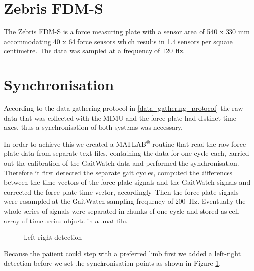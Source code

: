 \section{Zebris FDM-S}

The Zebris FDM-S is a force measuring plate with a sensor area of 540 x 330 mm accommodating 40 x 64 force sensors which results in 1.4 sensors per square centimetre. The data was sampled at a frequency of 120 Hz.

\section{Synchronisation}

According to the data gathering protocol in \ref{data_gathering_protocol} the raw data that was collected with the MIMU and the force plate had distinct time axes, thus a synchronisation of both systems was necessary.

In order to achieve this we created a MATLAB$\textsuperscript{\textregistered}$ routine that read the raw force plate data from separate text files, containing the data for one cycle each, carried out the calibration of the GaitWatch data and performed the synchronisation. Therefore it first detected the separate gait cycles, computed the differences between the time vectors of the force plate signals and the GaitWatch signals and corrected the force plate time vector, accordingly. Then the force plate signals were resampled at the GaitWatch sampling frequency of \mbox{200 Hz}. Eventually the whole series of signals were separated in chunks of one cycle and stored as cell array of time series objects in a .mat-file.

\begin{figure}
	\centering
	\caption{Left-right detection}
	\label{fig:left_right_detect}
\end{figure}

Because the patient could step with a preferred limb first we added a left-right detection before we set the synchronisation points as shown in Figure \ref{fig:left_right_detect}.